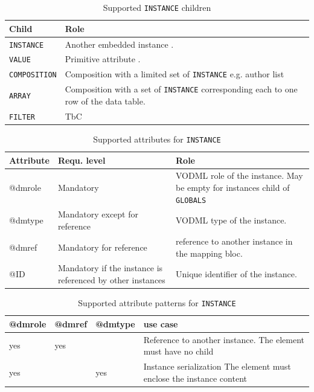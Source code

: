 \documentclass[11pt,a4paper]{ivoa}
\begin{document}
\begin{table}[ht!]
     \begin{tabular}{|p{3cm}|p{7cm}|}
       \hline Child &  Role\\
       \hline  \texttt{INSTANCE}    & Another embedded instance . \\       
       \hline  \texttt{VALUE}    & Primitive attribute . \\       
       \hline  \texttt{COMPOSITION}    & Composition with a limited set of  \texttt{INSTANCE} e.g. author list\\      
       \hline  \texttt{ARRAY}    & Composition with a set of  \texttt{INSTANCE} corresponding each to one row of the data table. \\
       \hline  \texttt{FILTER}    & TbC \\
       \hline 
     \end{tabular}
     \caption{Supported  \texttt{INSTANCE} children} 
 \end{table}

\begin{table}[ht!]
     \begin{tabular}{|p{1.5cm}|p{4cm}|p{7cm}|}
       \hline Attribute & Requ. level & Role\\
       \hline  @dmrole   & Mandatory & VODML role of the instance. May be empty for instances child of 
                                      \texttt{GLOBALS}  \\
       \hline  @dmtype  & Mandatory except for reference & VODML type of the instance.   \\
       \hline  @dmref  & Mandatory for reference & reference to another instance in the mapping bloc. \\          
       \hline  @ID  & Mandatory if the instance is referenced by other instances & Unique identifier of the instance. \\
       \hline 
     \end{tabular}
     \caption{Supported attributes for  \texttt{INSTANCE}} 
 \end{table}

\begin{table}[ht!]
\begin{tabular}{|p{1.5cm}|p{1.5cm}|p{1.5cm}|p{5cm}|}
\hline @dmrole & @dmref &  @dmtype &  use case\\
\hline  yes & yes &  & Reference to another instance. The element must have no child  \\
\hline  yes &  & yes  & Instance serialization The element must enclose the instance content  \\
\hline 
\end{tabular}
     \caption{Supported attribute patterns for  \texttt{INSTANCE}} 
 \end{table}
\end{document}
